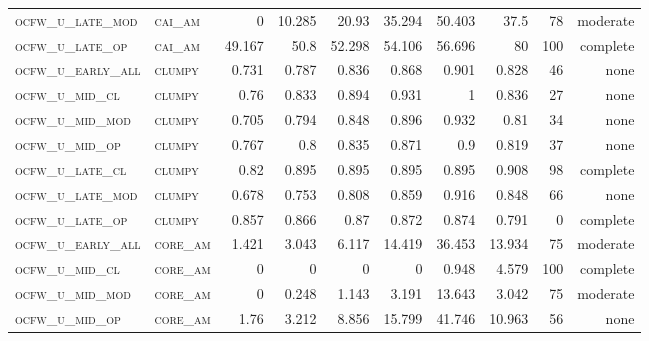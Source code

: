 \begin{landscape}
\begin{center}
\begin{footnotesize}
\begin{longtable}{llrrrrr|rrr}
\textsc{ocfw\_u\_late\_mod } & \textsc{cai\_am   }    & 0        & 10.285   & 20.93    & 35.294   & 50.403    & 37.5          & 78            & moderate       \\
\textsc{ocfw\_u\_late\_op  } & \textsc{cai\_am   }    & 49.167   & 50.8     & 52.298   & 54.106   & 56.696    & 80            & 100           & complete            \\
\textsc{ocfw\_u\_early\_all} & \textsc{clumpy    }    & 0.731    & 0.787    & 0.836    & 0.868    & 0.901     & 0.828         & 46            & none       \\
\textsc{ocfw\_u\_mid\_cl   } & \textsc{clumpy    }    & 0.76     & 0.833    & 0.894    & 0.931    & 1         & 0.836         & 27            & none       \\
\textsc{ocfw\_u\_mid\_mod  } & \textsc{clumpy    }    & 0.705    & 0.794    & 0.848    & 0.896    & 0.932     & 0.81          & 34            & none       \\
\textsc{ocfw\_u\_mid\_op   } & \textsc{clumpy    }    & 0.767    & 0.8      & 0.835    & 0.871    & 0.9       & 0.819         & 37            & none       \\
\textsc{ocfw\_u\_late\_cl  } & \textsc{clumpy    }    & 0.82     & 0.895    & 0.895    & 0.895    & 0.895     & 0.908         & 98            & complete       \\
\textsc{ocfw\_u\_late\_mod } & \textsc{clumpy    }    & 0.678    & 0.753    & 0.808    & 0.859    & 0.916     & 0.848         & 66            & none       \\
\textsc{ocfw\_u\_late\_op  } & \textsc{clumpy    }    & 0.857    & 0.866    & 0.87     & 0.872    & 0.874     & 0.791         & 0             & complete           \\
\textsc{ocfw\_u\_early\_all} & \textsc{core\_am  }    & 1.421    & 3.043    & 6.117    & 14.419   & 36.453    & 13.934        & 75            & moderate       \\
\textsc{ocfw\_u\_mid\_cl   } & \textsc{core\_am  }    & 0        & 0        & 0        & 0        & 0.948     & 4.579         & 100           & complete            \\
\textsc{ocfw\_u\_mid\_mod  } & \textsc{core\_am  }    & 0        & 0.248    & 1.143    & 3.191    & 13.643    & 3.042         & 75            & moderate       \\
\textsc{ocfw\_u\_mid\_op   } & \textsc{core\_am  }    & 1.76     & 3.212    & 8.856    & 15.799   & 41.746    & 10.963        & 56            & none       \\

\end{longtable}
\end{footnotesize}
\end{center}
\end{landscape}
